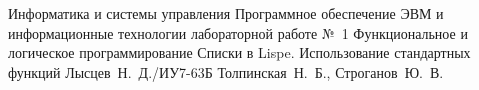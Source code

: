 \documentclass{bmstu}
\begin{document}
\makereporttitle
{Информатика и системы управления} %
{Программное обеспечение ЭВМ и информационные технологии}
{лабораторной работе №~1} %
{Функциональное и логическое программирование} %
{Списки в Lispe. Использование стандартных функций} %
{} %
{Лысцев~Н.~Д./ИУ7-63Б} %
{Толпинская~Н.~Б., Строганов~Ю.~В.} %
{}


%


%
%

\end{document}
